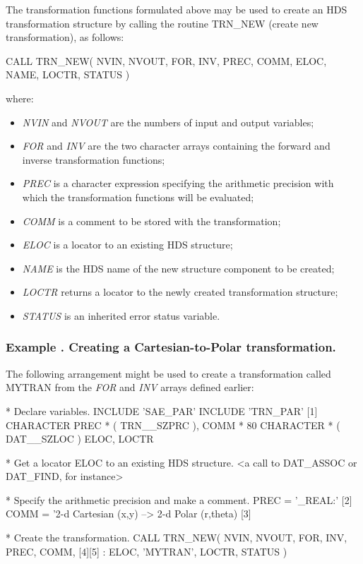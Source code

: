 \documentclass[twoside,nolof,11pt]{starlink}
\providecommand{\name}[1]{\small{#1}}
\providecommand{\fortvar}[1]{\emph{#1}}
\newcounter{examplecounter}
\providecommand{\example}[1]{\addtocounter{examplecounter}{1}
                         \subsubsection*{Example \theexamplecounter. #1}}
\begin{document}
The transformation functions formulated above may be used to create an
\name{HDS} transformation structure by calling the routine \name{TRN\_NEW}
(create new transformation), as follows:

\begin{terminalv}
CALL TRN_NEW( NVIN, NVOUT, FOR, INV, PREC, COMM, ELOC, NAME, LOCTR, STATUS )
\end{terminalv}

where:

\begin{itemize}

\item \fortvar{NVIN} and \fortvar{NVOUT} are the numbers of input and output
variables;

\item \fortvar{FOR} and \fortvar{INV} are the two character arrays
containing the forward and inverse transformation functions;

\item \fortvar{PREC} is a character expression specifying the arithmetic
precision with which the transformation functions will be evaluated;

\item \fortvar{COMM} is a comment to be stored with the transformation;

\item \fortvar{ELOC} is a locator to an existing \name{HDS} structure;

\item \fortvar{NAME} is the \name{HDS} name of the new structure component
to be created;

\item \fortvar{LOCTR} returns a locator to the newly created transformation
structure;

\item \fortvar{STATUS} is an inherited error status variable.

\end{itemize}

\example{Creating a Cartesian-to-Polar transformation.}
The following arrangement might be used to create a transformation called
\name{MYTRAN} from the \fortvar{FOR} and \fortvar{INV} arrays defined
earlier:

\begin{terminalv}
*  Declare variables.
      INCLUDE 'SAE_PAR'
      INCLUDE 'TRN_PAR'                                    [1]
      CHARACTER PREC * ( TRN__SZPRC ), COMM * 80
      CHARACTER * ( DAT__SZLOC ) ELOC, LOCTR

*  Get a locator ELOC to an existing HDS structure.
      <a call to DAT_ASSOC or DAT_FIND, for instance>

*  Specify the arithmetic precision and make a comment.
      PREC = '_REAL:'                                      [2]
      COMM = '2-d Cartesian (x,y) --> 2-d Polar (r,theta)  [3]

*  Create the transformation.
      CALL TRN_NEW( NVIN, NVOUT, FOR, INV, PREC, COMM,     [4][5]
     :              ELOC, 'MYTRAN', LOCTR, STATUS )

\end{terminalv}
\end{document}
